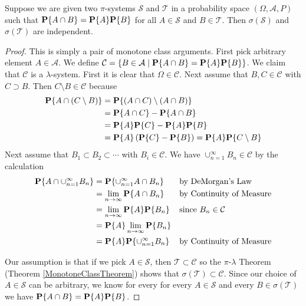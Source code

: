 \begin{lem}\label{IndependencePiSystem}Suppose we are given two
  $\pi$-systems $\mathcal{S}$ and $\mathcal{T}$ in a probability space
  $(\Omega, \mathcal{A}, P)$ such that
  $\textbf{P}\{A \cap B\} = \textbf{P}\{A\} \textbf{P}\{B\}$ for all
  $A \in \mathcal{S}$ and $B \in \mathcal{T}$.  Then
  $\sigma(\mathcal{S})$ and $\sigma(\mathcal{T})$ are independent.
\end{lem}
\begin{proof}
This is simply a pair of monotone class arguments.  First pick
arbitrary element $A
\in \mathcal{A}$.  We define $\mathcal{C} = \lbrace B \in
  \mathcal{A} \mid  \textbf{P}\{A \cap B\} =  \textbf{P}\{A\}
  \textbf{P}\{B\} \rbrace$.  We claim that $\mathcal{C}$ is a
  $\lambda$-system.  First it is clear that $\Omega \in \mathcal{C}$.
  Next assume that $B,C \in \mathcal{C}$ with $C \supset B$.  Then $C
\setminus B \in \mathcal{C}$ because
\begin{align*}
\textbf{P}\{A\cap ( C \setminus B)\} &= \textbf{P}\{ (A \cap C)
  \setminus (A \cap B)\} \\
&=\textbf{P}\{ A \cap C\}
  - \textbf{P}\{A \cap B\} \\
&=\textbf{P}\{ A\} \textbf{P}\{C\}
  - \textbf{P}\{A\} \textbf{P}\{B\} \\
&=\textbf{P}\{A\} \left(\textbf{P}\{C\}
  - \textbf{P}\{B\} \right) =  \textbf{P}\{ A\}
\textbf{P}\{C\setminus B\}\\
\end{align*}
Next assume that $B_1 \subset B_2 \subset \cdots$ with $B_i \in
\mathcal{C}$. We have $\cup_{n=1}^\infty B_n \in \mathcal{C}$ by the calculation
\begin{align*}
\textbf{P}\{A\cap\cup_{n=1}^\infty B_n\} &=
\textbf{P}\{\cup_{n=1}^\infty A \cap B_n\} & & \text{by DeMorgan's
  Law} \\
&=\lim_{n \to \infty} \textbf{P}\{ A \cap B_n\} & & \text{by
  Continuity of Measure} \\
&=\lim_{n \to \infty} \textbf{P}\{ A\} \textbf{P}\{B_n\} & &
\text{since $B_n \in \mathcal{C}$}\\
&=\textbf{P}\{ A\} \lim_{n \to \infty} \textbf{P}\{B_n\} \\
&=\textbf{P}\{A\} \textbf{P}\{\cup_{n=1}^\infty B_n\} & & \text{by
  Continuity of Measure}\\
\end{align*}

Our assumption is that if we pick $A \in \mathcal{S}$, then $\mathcal{T} \subset \mathcal{C}$ so the
$\pi$-$\lambda$ Theorem (Theorem \ref{MonotoneClassTheorem}) shows
that $\sigma(\mathcal{T}) \subset \mathcal{C}$.  Since our choice of
$A \in \mathcal{S}$ can be arbitrary, we know for every for every $A\in \mathcal{S}$ and
every $B \in \sigma(\mathcal{T})$ we have $\textbf{P}\{A \cap B\} =
\textbf{P}\{A\} \textbf{P}\{B\}$.  


\end{proof}
